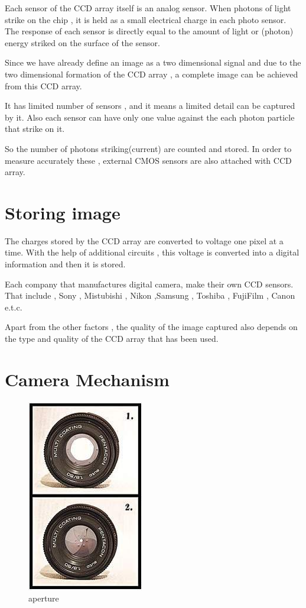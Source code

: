 \documentclass[a4paper]{article}
\begin{document}
Each sensor of the CCD array itself is an analog sensor. When photons of light strike on the chip , it is held as a small electrical charge in each photo sensor. The response of each sensor is directly equal to the amount of light or (photon) energy striked on the surface of the sensor.

Since we have already define an image as a two dimensional signal and due to the two dimensional formation of the CCD array , a complete image can be achieved from this CCD array.

It has limited number of sensors , and it means a limited detail can be captured by it. Also each sensor can have only one value against the each photon particle that strike on it.

So the number of photons striking(current) are counted and stored. In order to measure accurately these , external CMOS sensors are also attached with CCD array.

 \section{Storing image
}
The charges stored by the CCD array are converted to voltage one pixel at a time. With the help of additional circuits , this voltage is converted into a digital information and then it is stored.

Each company that manufactures digital camera, make their own CCD sensors. That include , Sony , Mistubishi , Nikon ,Samsung , Toshiba , FujiFilm , Canon e.t.c.

Apart from the other factors , the quality of the image captured also depends on the type and quality of the CCD array that has been used.
  \section{Camera Mechanism}
 \begin{figure}[h]
\centering
\includegraphics{ll}
\caption{aperture}
\end{figure} 
\end{document}

